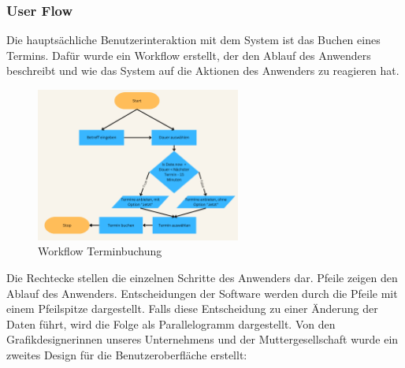\subsubsection{User Flow}\label{subsubsec:user-flow}
Die hauptsächliche Benutzerinteraktion mit dem System ist das Buchen eines Termins.
Dafür wurde ein Workflow erstellt, der den Ablauf des Anwenders beschreibt und wie das System auf die Aktionen des Anwenders zu reagieren hat.
\begin{figure}[h]
\par\vspace{1cm}
\centering
\includegraphics[width=0.6\textwidth]{Bilder/Workflow Terminbuchung}
\caption{Workflow Terminbuchung}
\label{fig:Workflow Terminbuchung}
\par\vspace{1cm}
\end{figure}
\justifying
\newline
Die Rechtecke stellen die einzelnen Schritte des Anwenders dar.
Pfeile zeigen den Ablauf des Anwenders.
Entscheidungen der Software werden durch die Pfeile mit einem Pfeilspitze dargestellt.
Falls diese Entscheidung zu einer Änderung der Daten führt, wird die Folge als Parallelogramm dargestellt.
\newline
\newline
Von den Grafikdesignerinnen unseres Unternehmens und der Muttergesellschaft wurde ein zweites Design für die Benutzeroberfläche erstellt:

